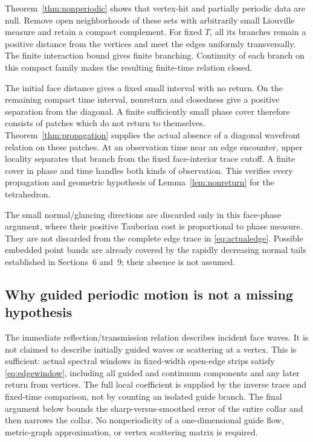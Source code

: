 \documentclass[11pt]{amsart}
\numberwithin{equation}{section}
\theoremstyle{remark}
\begin{document}
Theorem~\ref{thm:nonperiodic} shows that vertex-hit and partially periodic data are null. Remove open neighborhoods of these sets with arbitrarily small Liouville measure and retain a compact complement. For fixed $T$, all its branches remain a positive distance from the vertices and meet the edges uniformly transversally. The finite interaction bound gives finite branching. Continuity of each branch on this compact family makes the resulting finite-time relation closed.

The initial face distance gives a fixed small interval with no return. On the remaining compact time interval, nonreturn and closedness give a positive separation from the diagonal. A finite sufficiently small phase cover therefore consists of patches which do not return to themselves. Theorem~\ref{thm:propagation} supplies the actual absence of a diagonal wavefront relation on these patches. At an observation time near an edge encounter, upper locality separates that branch from the fixed face-interior trace cutoff. A finite cover in phase and time handles both kinds of observation. This verifies every propagation and geometric hypothesis of Lemma~\ref{lem:nonreturn} for the tetrahedron.

The small normal/glancing directions are discarded only in this face-phase argument, where their positive Tauberian cost is proportional to phase measure. They are not discarded from the complete edge trace in \eqref{eq:actualedge}. Possible embedded point bands are already covered by the rapidly decreasing normal tails established in Sections~6 and~9; their absence is not assumed.

\subsection{Why guided periodic motion is not a missing hypothesis}
The immediate reflection/transmission relation describes incident face waves. It is not claimed to describe initially guided waves or scattering at a vertex. This is sufficient: actual spectral windows in fixed-width open-edge strips satisfy \eqref{eq:edgewindow}, including all guided and continuum components and any later return from vertices. The full local coefficient is supplied by the inverse trace and fixed-time comparison, not by counting an isolated guide branch. The final argument below bounds the sharp-versus-smoothed error of the entire collar and then narrows the collar. No nonperiodicity of a one-dimensional guide flow, metric-graph approximation, or vertex scattering matrix is required.
\end{document}
